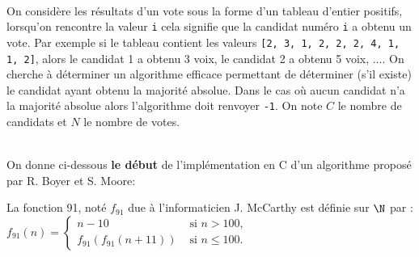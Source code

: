 \documentclass[11pt,a4paper]{article}
\begin{document}
\begin{Exercise}[title={majorité absolue}]\\
On considère les résultats d'un vote sous la forme d'un tableau d'entier positifs, lorsqu'on rencontre la valeur {\tt i} cela signifie que la candidat numéro {\tt i} a obtenu un vote. Par exemple si le tableau contient les valeurs {\tt [2, 3, 1, 2, 2, 2, 4, 1, 1, 2]}, alors le candidat 1 a obtenu 3 voix, le candidat 2 a obtenu 5 voix, $\dots$.
On cherche à déterminer un algorithme efficace permettant de déterminer (s'il existe) le candidat ayant obtenu la majorité absolue. Dans le cas où aucun candidat n'a la majorité absolue alors l'algorithme doit renvoyer {\tt -1}.
On note $C$ le nombre de candidats et $N$ le nombre de votes.

\\
On donne ci-dessous \textbf{le début} de l'implémentation en C d'un algorithme  proposé par R. Boyer et S. Moore:
\end{Exercise}



\begin{Exercise}[title={Fonction 91}]
    La fonction 91, noté $f_{91}$ due à l'informaticien J. McCarthy est définie sur $\N$ par : \\
    $f_{91}(n) = \left\{
        \begin{array}{lr}
            n-10 & \text{ si } n>100, \\
            f_{91}(f_{91}(n+11))  & \text{ si } n \leq 100.
        \end{array}
    \right.$
    \end{Exercise}
\end{document}
